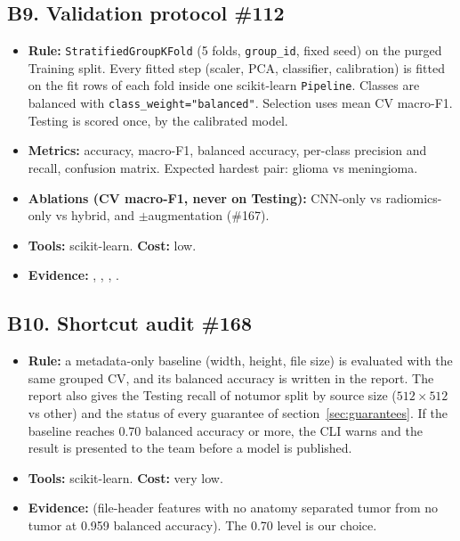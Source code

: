 \documentclass[11pt,a4paper]{article}
\newcommand{\board}[1]{\textsf{\##1}}
\begin{document}
\subsection*{B9. Validation protocol \hfill \board{112}}
\begin{itemize}
  \item \textbf{Rule:} \texttt{StratifiedGroupKFold} (5 folds, \texttt{group\_id}, fixed seed) on the purged Training split. Every fitted step (scaler, PCA, classifier, calibration) is fitted on the fit rows of each fold inside one scikit-learn \texttt{Pipeline}. Classes are balanced with \texttt{class\_weight="balanced"}. Selection uses mean CV macro-F1. Testing is scored once, by the calibrated model.
  \item \textbf{Metrics:} accuracy, macro-F1, balanced accuracy, per-class precision and recall, confusion matrix. Expected hardest pair: glioma vs meningioma.
  \item \textbf{Ablations (CV macro-F1, never on Testing):} CNN-only vs radiomics-only vs hybrid, and $\pm$augmentation (\board{167}).
  \item \textbf{Tools:} scikit-learn. \textbf{Cost:} low.
  \item \textbf{Evidence:} \cite{r2}, \cite{r4}, \cite{r9}, \cite{r12}.
\end{itemize}

\subsection*{B10. Shortcut audit \hfill \board{168}}
\begin{itemize}
  \item \textbf{Rule:} a metadata-only baseline (width, height, file size) is evaluated with the same grouped CV, and its balanced accuracy is written in the report. The report also gives the Testing recall of notumor split by source size ($512\times512$ vs other) and the status of every guarantee of section~\ref{sec:guarantees}. If the baseline reaches 0.70 balanced accuracy or more, the CLI warns and the result is presented to the team before a model is published.
  \item \textbf{Tools:} scikit-learn. \textbf{Cost:} very low.
  \item \textbf{Evidence:} \cite{r1} (file-header features with no anatomy separated tumor from no tumor at 0.959 balanced accuracy). The 0.70 level is our choice.
\end{itemize}

\end{document}
